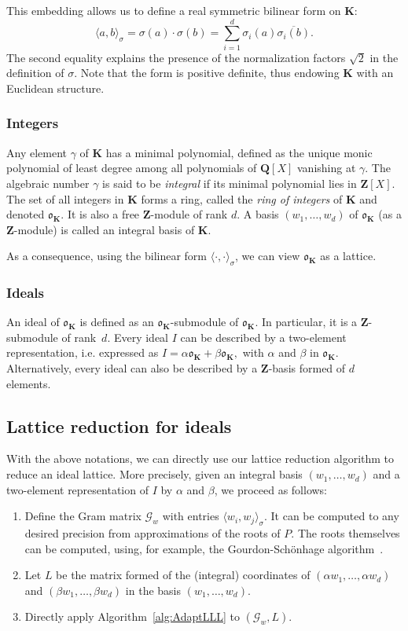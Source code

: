 \documentclass{amsart}
\newcommand{\vect}[1]{{#1}}
\newcommand{\inner}[2]{\langle \vect{#1},\vect{#2} \rangle}
\newcommand{\Gram}{\mathcal{G}}
\newcommand{\ZZ}{\mathbf{Z}}
\newcommand{\KK}{\mathbf{K}}
\newcommand{\QQ}{\mathbf{Q}}
\newcommand{\order}{\mathfrak{o}}
\theoremstyle{definition}
\begin{document}
This embedding allows us to define a real symmetric bilinear form on $\KK$:
 \[\inner{\vect{a}}{b}_\sigma=\sigma(a)\cdot\sigma(b)=\sum_{i=1}^{d}
 \sigma_i(\vect{a})\overline{\sigma_i(b)}.\]
The second equality explains the presence of the normalization factors
$\sqrt{2}$ in the definition of $\sigma$. Note that the form is
positive definite, thus endowing $\KK$ with an Euclidean structure.

\subsubsection*{Integers}
Any element $\gamma$ of $\KK$ has a minimal polynomial, defined as
the unique monic polynomial of least degree among all polynomials of
$\QQ[X]$ vanishing at $\gamma$.  The algebraic number $\gamma$ is said
to be \emph{integral} if its minimal polynomial lies in $\ZZ[X]$. The
set of all integers in $\KK$ forms a ring, called the {\it ring of
integers} of $\KK$ and denoted $\order_\KK$. It is also a free
$\ZZ$-module of rank $d$. A basis $(w_1,\ldots, w_d)$ of $\order_\KK$
(as a $\ZZ$-module) is called an integral basis of $\KK$.

As a consequence, using the bilinear form
$\inner{\cdot}{\cdot}_{\sigma}$, we can view $\order_\KK$ as a
lattice.

\subsubsection*{Ideals}
An ideal of $\order_\KK$ is defined as an $\order_\KK$-submodule of
$\order_\KK$. In particular, it is a $\ZZ$-submodule of rank~$d$.
Every ideal $I$ can be described by a two-element
representation, i.e. expressed as $I=\alpha \order_\KK
+ \beta \order_\KK,$ with $\alpha$ and $\beta$ in
$\order_\KK$. Alternatively, every ideal can also be described by a
$\ZZ$-basis formed of $d$ elements.

\subsection{Lattice reduction for ideals}
With the above notations, we can directly use our lattice reduction
algorithm to reduce an ideal lattice. More precisely, given an
integral basis $(w_1,\ldots, w_d)$ and a two-element representation of
$I$ by $\alpha$ and $\beta$, we proceed as follows:
\begin{enumerate}
  \item Define the Gram matrix $\Gram_{w}$ with entries
    $\inner{w_i}{w_j}_{\sigma}$. It can be computed to any desired
    precision from approximations of the roots of $P$. The roots
    themselves can be computed, using, for example, the
    Gourdon-Sch\"onhage algorithm~\cite{Gourdon96}.
  \item Let $L$ be the matrix formed of the (integral) coordinates of
    $(\alpha w_1, \ldots, \alpha w_d)$ and $(\beta w_1, \ldots, \beta
    w_d)$ in the basis  $(w_1,\ldots, w_d).$
  \item Directly apply Algorithm~\ref{alg:AdaptLLL} to $(\Gram_w,L).$
\end{enumerate}
\end{document}
